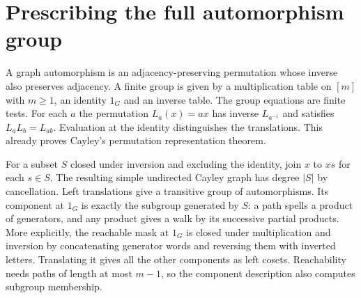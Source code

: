 \section{Prescribing the full automorphism group}\label{co:symmetry}
A graph automorphism is an adjacency-preserving permutation whose inverse
also preserves adjacency. A finite group is given by a multiplication
table on $[m]$ with $m\ge1$, an identity $1_G$ and an inverse table.
The group equations are finite tests. For each $a$ the permutation
$L_a(x)=ax$ has inverse $L_{a^{-1}}$ and satisfies $L_aL_b=L_{ab}$.
Evaluation at the identity distinguishes the translations. This already
proves Cayley's permutation representation theorem.

For a subset $S$ closed under inversion and excluding the identity,
join $x$ to $xs$ for each $s\in S$. The resulting simple undirected
Cayley graph has degree $|S|$ by cancellation. Left translations give
a transitive group of automorphisms. Its component at $1_G$ is exactly
the subgroup generated by $S$: a path spells a product of generators,
and any product gives a walk by its successive partial products. More
explicitly, the reachable mask at $1_G$ is closed under multiplication
and inversion by concatenating generator words and reversing them with
inverted letters. Translating it gives all the other components as left
cosets. Reachability needs paths of length at most $m-1$, so the component
description also computes subgroup membership.

